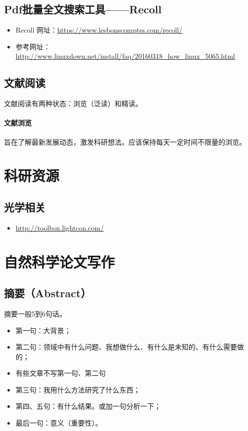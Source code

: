\subsection{Pdf批量全文搜索工具——Recoll}
\begin{itemize}
\item Recoll 网址：\url{https://www.lesbonscomptes.com/recoll/}

\item 参考网址：\url{http://www.linuxdown.net/install/faq/20160318_how_linux_5065.html}
\end{itemize}


\subsection{文献阅读}
文献阅读有两种状态：浏览（泛读）和精读。

\paragraph{文献浏览}旨在了解最新发展动态，激发科研想法。应该保持每天一定时间不限量的浏览。






\section{科研资源}
\subsection{光学相关}
 \begin{itemize}
\item \url{http://toolbox.lightcon.com/}
\end{itemize}


\section{自然科学论文写作}
\subsection{摘要（Abstract）}
摘要一般5到6句话。
\begin{itemize}
\item 第一句：大背景；
\item 第二句：领域中有什么问题、我想做什么、有什么是未知的、有什么需要做的；
\item 有些文章不写第一句、第二句
\item 第三句：我用什么方法研究了什么东西；
\item 第四、五句：有什么结果。或加一句分析一下；
\item 最后一句：意义（重要性）。
\end{itemize}


